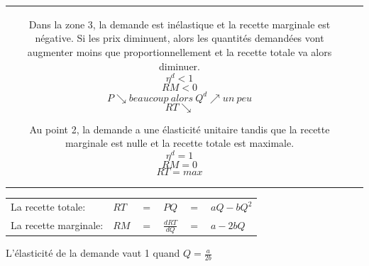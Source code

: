 \begin{center}
\begin{tabular}{cp{}}
		Dans la zone 3, la demande est \textcolor[rgb]{1,0,0}{inélastique} et la recette marginale est \textcolor[rgb]{1,0,0}{négative}.
		Si les prix diminuent, alors les quantités demandées vont \textcolor[rgb]{1,0,0}{augmenter} moins que proportionnellement et la recette totale va alors \textcolor[rgb]{1,0,0}{diminuer}.
		$$\eta^d < 1$$
		$$RM < 0$$
		$$P \searrow beaucoup\ alors\ Q^d \nearrow un\ peu$$
		$$RT \searrow$$

		Au point 2, la demande a une élasticité unitaire tandis que la recette marginale est nulle et la recette totale est maximale.
		$$\eta^d = 1$$
		$$RM = 0$$
		$$RT = max$$
	\end{tabular}
\end{center}
\begin{tabular}{llllll}
	La recette totale:    & $RT$ & $=$ & $PQ$ & $=$ & $aQ - bQ^2$\\
	La recette marginale: & $RM$ & $=$ & $\frac{dRT}{dQ}$ & $=$ & $a - 2bQ$\\
\end{tabular}\newline
L’élasticité de la demande vaut 1 quand $Q=\frac{a}{2b}$